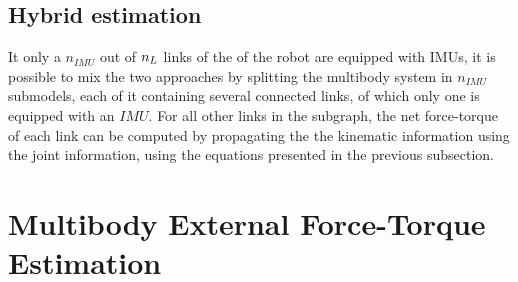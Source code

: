 \subsection{Hybrid estimation}
It only a $n_{IMU}$ out of $n_{L}$ links of the of the robot are equipped with IMUs, it is possible to mix the two approaches by splitting the multibody system in $n_{IMU}$ submodels, each of it containing several connected links, of which only one is equipped with an $IMU$. For all other links in the subgraph, the net force-torque of each link can be computed by propagating the the kinematic information using the joint information, using the equations presented in the previous subsection. 


\section{Multibody External Force-Torque Estimation}
\label{sec:multibody-external-ft-estimation}
